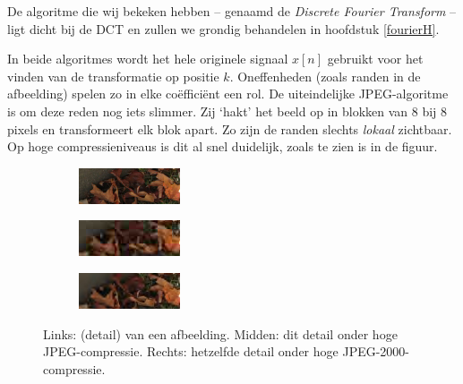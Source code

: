 \documentclass[11pt]{uvamath}
\theoremstyle{plain}
\theoremstyle{definition}
\theoremstyle{remark}
\begin{document}
De algoritme die wij bekeken hebben -- genaamd de \emph{Discrete Fourier Transform} -- ligt dicht bij de DCT en zullen we grondig behandelen in hoofdstuk \ref{fourierH}.

In beide algoritmes wordt het hele originele signaal $x[n]$ gebruikt voor het vinden van de transformatie op positie $k$. Oneffenheden (zoals randen in de afbeelding) spelen zo in elke co\"effici\"ent een rol. De uiteindelijke JPEG-algoritme is om deze reden nog iets slimmer. Zij `hakt' het beeld op in blokken van 8 bij 8 pixels en transformeert elk blok apart. Zo zijn de randen slechts \emph{lokaal} zichtbaar. Op hoge compressieniveaus is dit al snel duidelijk, zoals te zien is in de figuur.
\begin{figure}[h]
\label{duidelijk}
	\centering
	\begin{subfigure}{0.32\linewidth}
		\includegraphics[width=\linewidth]{plaatjes/jpeg_crop.jpg}
	\end{subfigure}
	\begin{subfigure}{0.32\linewidth}
		\includegraphics[width=\linewidth]{plaatjes/jpeg_jpeg_crop.jpg}
	\end{subfigure}
	\begin{subfigure}{0.32\linewidth}
		\includegraphics[width=\linewidth]{plaatjes/jpeg_jpeg2k_crop.jpg}
	\end{subfigure}
	\caption{Links: (detail) van een afbeelding. Midden: dit detail onder hoge JPEG-compressie. Rechts: hetzelfde detail onder hoge JPEG-2000-compressie.}
\end{figure}
\end{document}
